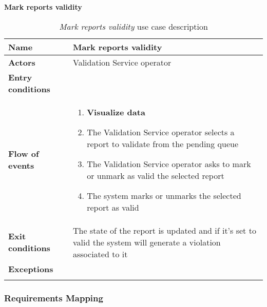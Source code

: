 \textbf{Mark reports validity}
\begin{longtable}{p{0.25\linewidth}p{0.75\linewidth}}
\toprule
\textbf{Name} & \textbf{Mark reports validity} \\
\midrule
\textbf{Actors} & Validation Service operator \\
\midrule
\textbf{Entry \newline conditions} & \\
\midrule
\textbf{Flow of events} & 
\begin{enumerate}
	\item \textbf{Visualize data}
	\item The Validation Service operator selects a report to validate from the pending queue
	\item The Validation Service operator asks to mark or unmark as valid the selected report
	\item The system marks or unmarks the selected report as valid
\end{enumerate}\\
\midrule
\textbf{Exit conditions} & The state of the report is updated and if it's set to valid the system will generate a violation associated to it\\
\midrule
\textbf{Exceptions} & 
 \\
\bottomrule
\caption{\emph{Mark reports validity} use case description}
\end{longtable}

\clearpage
\subsubsection{Requirements Mapping}

